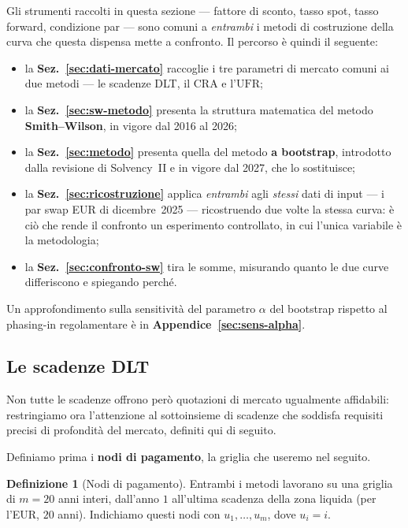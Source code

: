 \documentclass[11pt,a4paper]{article}
\theoremstyle{plain}
\theoremstyle{definition}
\newtheorem{definizione}[teorema]{Definizione}
\theoremstyle{remark}
\newcommand{\UFR}{\mathrm{UFR}}
\begin{document}
\begin{keybox}
Gli strumenti raccolti in questa sezione --- fattore di sconto, tasso spot, tasso forward,
condizione par --- sono comuni a \emph{entrambi} i metodi di costruzione della curva che
questa dispensa mette a confronto. Il percorso \`e quindi il seguente:
\begin{itemize}
  \item la \textbf{Sez.~\ref{sec:dati-mercato}} raccoglie i tre parametri di mercato comuni
        ai due metodi --- le scadenze DLT, il CRA e l'$\UFR$;
  \item la \textbf{Sez.~\ref{sec:sw-metodo}} presenta la struttura matematica del metodo
        \textbf{Smith--Wilson}, in vigore dal 2016 al 2026;
  \item la \textbf{Sez.~\ref{sec:metodo}} presenta quella del metodo \textbf{a bootstrap},
        introdotto dalla revisione di Solvency~II e in vigore dal 2027, che lo sostituisce;
  \item la \textbf{Sez.~\ref{sec:ricostruzione}} applica \emph{entrambi} agli \emph{stessi}
        dati di input --- i par swap EUR di dicembre~2025 --- ricostruendo due volte la stessa
        curva: \`e ci\`o che rende il confronto un esperimento controllato, in cui l'unica
        variabile \`e la metodologia;
  \item la \textbf{Sez.~\ref{sec:confronto-sw}} tira le somme, misurando quanto le due curve
        differiscono e spiegando perch\'e.
\end{itemize}
Un approfondimento sulla sensitivit\`a del parametro $\alpha$ del bootstrap rispetto al
phasing-in regolamentare \`e in \textbf{Appendice~\ref{sec:sens-alpha}}.
\end{keybox}

\subsection{Le scadenze DLT} 
\label{sec:dlt-def}
Non tutte le scadenze offrono per\`o quotazioni di mercato ugualmente affidabili: restringiamo
ora l'attenzione al sottoinsieme di scadenze che soddisfa requisiti precisi di profondit\`a
del mercato, definiti qui di seguito.

Definiamo prima i \textbf{nodi di pagamento}, la griglia che useremo nel seguito.

\begin{definizione}[Nodi di pagamento]
\label{def:nodi-pagamento}
Entrambi i metodi lavorano su una griglia di $m=20$ anni interi, dall'anno $1$ all'ultima
scadenza della zona liquida (per l'EUR, $20$ anni). Indichiamo questi nodi con
$u_1,\ldots,u_m$, dove $u_i=i$.
\end{definizione}
\end{document}
